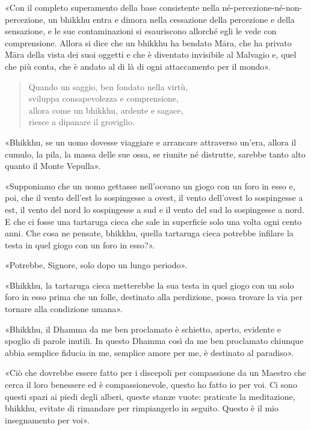  «Con il completo superamento della base consistente nella
né-percezione-né-non-percezione, un bhikkhu entra e dimora nella
cessazione della percezione e della sensazione, e le sue contaminazioni
si esauriscono allorché egli le vede con comprensione. Allora si dice
che un bhikkhu ha bendato Māra, che ha privato Māra della vista dei suoi
oggetti e che è diventato invisibile al Malvagio e, quel che più conta,
che è andato al di là di ogni attaccamento per il mondo».




\begin{quote}
Quando un saggio, ben fondato nella virtù, \\
sviluppa consapevolezza e comprensione, \\
allora come un bhikkhu, ardente e sagace, \\
riesce a dipanare il groviglio.
\end{quote}



«Bhikkhu, se un uomo dovesse viaggiare e arrancare attraverso un’era,
allora il cumulo, la pila, la massa delle sue ossa, se riunite né
distrutte, sarebbe tanto alto quanto il Monte Vepulla».




«Supponiamo che un uomo gettasse nell’oceano un giogo con un foro in
esso e, poi, che il vento dell’est lo sospingesse a ovest, il vento
dell’ovest lo sospingesse a est, il vento del nord lo sospingesse a sud
e il vento del sud lo sospingesse a nord. E che ci fosse una tartaruga
cieca che sale in superficie solo una volta ogni cento anni. Che cosa ne
pensate, bhikkhu, quella tartaruga cieca potrebbe infilare la testa in
quel giogo con un foro in esso?».


«Potrebbe, Signore, solo dopo un lungo periodo».


«Bhikkhu, la tartaruga cieca metterebbe la sua testa in quel giogo con
un solo foro in esso prima che un folle, destinato alla perdizione,
possa trovare la via per tornare alla condizione umana».




«Bhikkhu, il Dhamma da me ben proclamato è schietto, aperto, evidente e
spoglio di parole inutili. In questo Dhamma così da me ben proclamato
chiunque abbia semplice fiducia in me, semplice amore per me, è
destinato al paradiso».




«Ciò che dovrebbe essere fatto per i discepoli per compassione da un
Maestro che cerca il loro benessere ed è compassionevole, questo ho
fatto io per voi. Ci sono questi spazi ai piedi degli alberi, queste
stanze vuote: praticate la meditazione, bhikkhu, evitate di rimandare
per rimpiangerlo in seguito. Questo è il mio insegnamento per voi».


